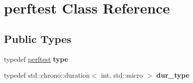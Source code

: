 \hypertarget{classperftest}{}\section{perftest Class Reference}
\label{classperftest}
\subsection*{Public Types}
\begin{DoxyCompactItemize}
\item 
typedef \hyperlink{classperftest}{perftest} {\bfseries type}\hypertarget{classperftest_aa3bc7062756508ea5ef5d5b6ab670123}{}\label{classperftest_aa3bc7062756508ea5ef5d5b6ab670123}

\item 
typedef std\+::chrono\+::duration$<$ int, std\+::micro $>$ {\bfseries dur\+\_\+type}\hypertarget{classperftest_a73df13a9223345b26476878a25eb1946}{}\label{classperftest_a73df13a9223345b26476878a25eb1946}

\end{DoxyCompactItemize}
